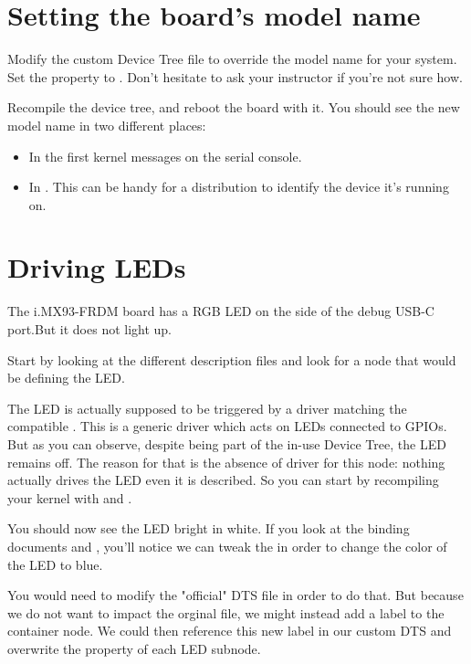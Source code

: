 \section{Setting the board's model name}

Modify the custom Device Tree file to override the model name for your
system. Set the  property to . Don't hesitate to ask your instructor if you're not sure how.

Recompile the device tree, and reboot the board with it. You should see
the new model name in two different places:

\begin{itemize}
\item In the first kernel messages on the serial console.
\item In . This can be
      handy for a distribution to identify the device it's running on.
\end{itemize}

\section{Driving LEDs}

The i.MX93-FRDM board has a RGB LED on the side of the debug USB-C port.But it does not light up.

Start by looking at the different description files and look for a node
that would be defining the LED.

The LED is actually supposed to be triggered by a driver matching
the compatible . This is a generic driver which acts on
LEDs connected to GPIOs. But as you can observe, despite being part of
the in-use Device Tree, the LED remains off. The reason for that is the
absence of driver for this node: nothing actually drives the LED even
it is described. So you can start by recompiling your kernel with
 and .

You should now see the LED bright in white. If you look at the binding
documents
 and
, you'll
notice we can tweak the  in order to change the
color of the LED to blue.

You would need to modify the "official" DTS file in order to do that.
But because we do not want to impact the orginal file, we might instead
add a label to the  container node. We
could then reference this new label in our custom DTS and overwrite the
 property of each LED subnode.

